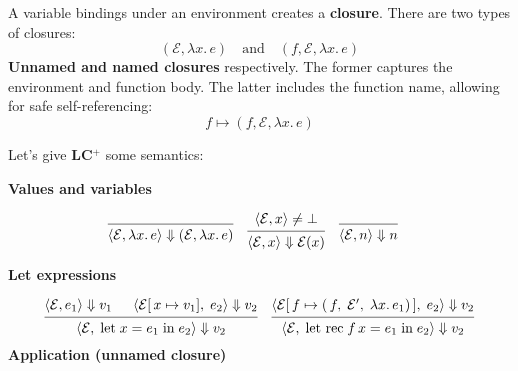 \begin{Def}

    A variable bindings under an environment creates a \textbf{closure}. There are two types of closures:
    \[
        (\mathcal{E}, \lambda x.\,e) \quad \text{and} \quad (f,\mathcal{E}, \lambda x.\,e)
    \]
    \textbf{Unnamed and named closures} respectively. The former captures the environment and function body. The 
    latter includes the function name, allowing for safe self-referencing:
    \[
        f\mapsto (f,\mathcal{E}, \lambda x.\,e)
    \]
\end{Def}
\newpage 

\noindent
Let's give \textbf{LC$^+$} some semantics:
\begin{Def}[LC$^+$ Semantics]

    \textbf{Values and variables}

\[
\begin{matrix}
\begin{prooftree}
  \infer0{
    \langle\mathcal{E}, \lambda x.\,e\rangle \Downarrow (\mathcal{E}, \lambda x.\,e)
  }
\end{prooftree}
&
\begin{prooftree}
    \hypo{\langle\mathcal{E}, x\rangle \neq \bot}
  \infer1{
    \langle\mathcal{E}, x\rangle \Downarrow \mathcal{E}(x)
  }
\end{prooftree}
&
\begin{prooftree}
  \infer0{
    \langle\mathcal{E}, n\rangle \Downarrow n
  }
\end{prooftree}
&
\end{matrix}
\]


\noindent
\textbf{Let expressions}

\[
\begin{matrix}
\begin{prooftree}
  \hypo{\langle\mathcal{E}, e_{1}\rangle \Downarrow v_{1}}
  \hypo{\langle\mathcal{E}[\,x \mapsto v_{1}],\; e_{2}\rangle \Downarrow v_2}
  \infer2{
    \langle\mathcal{E},\; \text{let}\; x = e_{1}\; \text{in}\; e_{2}\rangle \Downarrow v_2
  }
\end{prooftree}
&
\begin{prooftree}
  \hypo{\langle\mathcal{E}[\,f \mapsto (\,f,\;\mathcal{E}',\;\lambda x.\,e_1)\,],\; e_{2}\rangle \Downarrow v_2}
  \infer1{
    \langle\mathcal{E},\; \text{let rec}\; f\,x = e_{1}\; \text{in}\; e_{2}\rangle \Downarrow v_2
  }
\end{prooftree}
\end{matrix}
\]
\noindent
\textbf{Application (unnamed closure)}


\end{Def}
